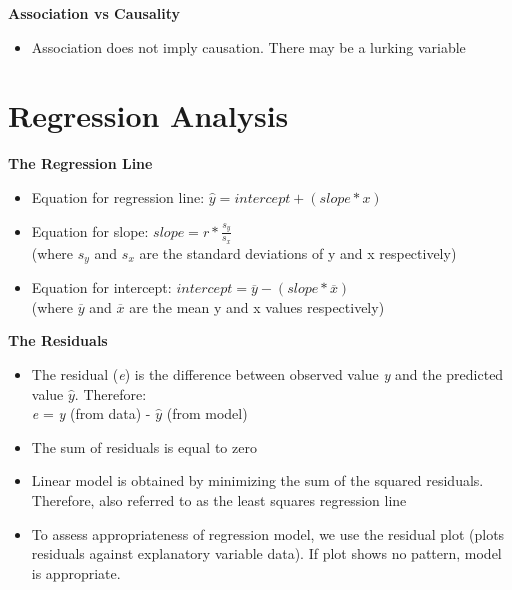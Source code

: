 \documentclass{article}
\begin{document}
\noindent
\textbf{Association vs Causality}
\begin{itemize}
    \item Association does not imply causation. There may be a lurking variable
\end{itemize}

\section{Regression Analysis}

\textbf{The Regression Line}
\begin{itemize}
    \item Equation for regression line: \begin{math}\hat y = intercept + (slope * x)\end{math}
    \item Equation for slope: \begin{math}
    slope = r * \frac{s_y}{s_x}
    \end{math}\\
    (where \begin{math}s_y\end{math} and \begin{math}s_x\end{math} are the standard deviations of y and x respectively)
    \item Equation for intercept: \begin{math}
    intercept = \overline{y} - (slope * \overline{x})
    \end{math} \\
    (where \begin{math}\overline{y}\end{math} and \begin{math}\overline{x}\end{math} are the mean y and x values respectively)
\end{itemize}

\noindent
\textbf{The Residuals}
\begin{itemize}
    \item The residual (\emph{e}) is the difference between observed value \emph{y} and the predicted value \begin{math}
    \hat{y}
    \end{math}. Therefore:\\
    \emph{e} = \emph{y} (from data) - \begin{math}
    \hat{y}
    \end{math} (from model)
    \item The sum of residuals is equal to zero
    \item Linear model is obtained by minimizing the sum of the squared residuals. Therefore, also referred to as the least squares regression line
    \item To assess appropriateness of regression model, we use the residual plot (plots residuals against explanatory variable data). If plot shows no pattern, model is appropriate. 
\end{itemize}
\end{document}
